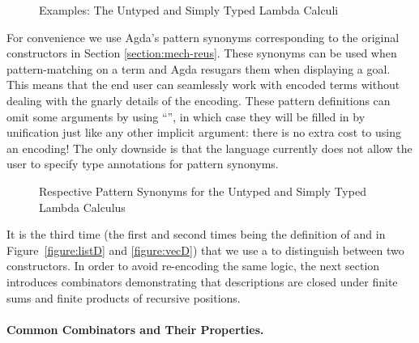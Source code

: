 \begin{figure}[h]
\begin{minipage}{0.4\textwidth}
\end{minipage}\hfill
\begin{minipage}{0.5\textwidth}
\end{minipage}
\caption{Examples: The Untyped and Simply Typed Lambda Calculi}
\end{figure}

For convenience we use Agda's pattern synonyms corresponding to the
original constructors in Section \ref{section:mech-reus}. These
synonyms can be used when pattern-matching on a term and Agda resugars
them when displaying a goal. This means that the end user can
seamlessly work with encoded terms without dealing with the gnarly
details of the encoding.  These pattern definitions can omit some
arguments by using ``\AS{\_}'', in which case they will be filled in
by unification just like any other implicit argument: there is no
extra cost to using an encoding!  The only downside is that the
language currently does not allow the user to specify type annotations
for pattern synonyms.

\begin{figure}[h]
\begin{minipage}{0.40\textwidth}
\end{minipage}\hspace{2em}
\begin{minipage}{0.50\textwidth}
\end{minipage}
\caption{Respective Pattern Synonyms for the Untyped and Simply Typed Lambda Calculus}
\end{figure}

It is the third time (the first and second times being the definition of
 and  in Figure~\ref{figure:listD} and \ref{figure:vecD})
that we use a  to distinguish between two constructors. In order
to avoid re-encoding the same logic,
the next section introduces combinators demonstrating that
descriptions are closed under finite sums and finite products
of recursive positions.

\paragraph{Common Combinators and Their Properties.}\label{desccomb}

